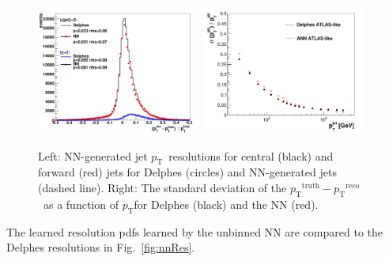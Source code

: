 \documentclass[showpacs,showkeys,preprint,prd,nofootinbib,linenumbers,12pt]{revtex4-1}
\def\pt{\ensuremath{p_{\mathrm{T}}}}
\def\ptRes{\ensuremath{\pt^{\mathrm{truth}}-\pt^{\mathrm{reco}}}}
\begin{document}
\begin{figure}[htb]
  \includegraphics[width=0.48\textwidth]{plot_ptres_eta.pdf}
  \includegraphics[width=0.48\textwidth]{plot_ptres_all.pdf}
  \caption{Left: NN-generated jet \pt\ resolutions for central (black) and forward (red) jets for Delphes (circles) and NN-generated jets (dashed line).
  Right: The standard deviation of the \ptRes\ as a function of \pt for Delphes (black) and the NN (red).}
  \label{fig:plot_ptres_eta_binned}
\end{figure}


The learned resolution pdfs learned by the unbinned NN are compared to the Delphes resolutions in Fig.~\ref{fig:nnRes}.
\end{document}
